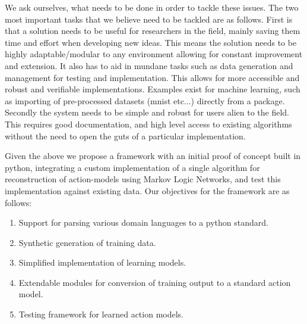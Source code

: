 % 
We ask ourselves, what needs to be done in order to tackle these issues.
The two most important tasks that we believe need to be tackled are as follows.
First is that a solution needs to be useful for researchers in the field,
mainly saving them time and effort when developing new ideas.
This means the solution needs to be highly adaptable/modular to any environment allowing for constant improvement and extension.
It also has to aid in mundane tasks such as data generation and management for testing and implementation.
This allows for more accessible and robust and verifiable implementations.
Examples exist for machine learning, such as importing of pre-processed datasets (mnist etc...) directly from a package.
Secondly the system needs to be simple and robust for users alien to the field.
This requires good documentation, and high level access to existing algorithms without the need to open the guts of a particular implementation.


Given the above we propose a framework with an initial proof of concept built in python,
integrating a custom implementation of a single algorithm for reconstruction of action-models using Markov Logic Networks,
and test this implementation against existing data.
Our objectives for the framework are as follows:
\begin{enumerate}
    \item Support for parsing various domain languages to a python standard.
    \item Synthetic generation of training data.
    \item Simplified implementation of learning models.
    \item Extendable modules for conversion of training output to a standard action model.
    \item Testing framework for learned action models.
\end{enumerate}
